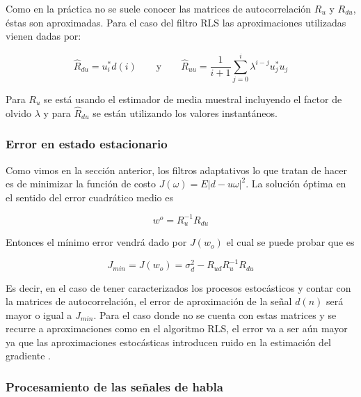 Como en la práctica no se suele conocer las matrices de autocorrelación $R_u$ y $R_{du}$, éstas son aproximadas. Para el caso del filtro RLS las aproximaciones utilizadas vienen dadas por:

\begin{equation*}
	\hat{R}_{du} = u_i^* d(i) \qquad \text{y} \qquad \hat{R}_{uu} = \frac{1}{i+1} \sum_{j=0}^{i} \lambda^{i-j} u_j^* u_j
\end{equation*}

Para $R_u$ se está usando el estimador de media muestral incluyendo el factor de olvido $\lambda$ y para $\hat{R}_{du}$ se están utilizando los valores instantáneos.

\subsubsection{Error en estado estacionario}
\label{sec:adaptive_filter_stationary_error}

Como vimos en la sección anterior, los filtros adaptativos lo que tratan de hacer es de minimizar la función de costo $J(\omega) = E | d - u \omega |^2$. La solución óptima en el sentido del error cuadrático medio es \cite{fundamentals_of_adaptive_filtering}

\begin{equation*}
	w^o = R_u^{-1}R_{du}
\end{equation*}

Entonces el mínimo error vendrá dado por $J(w_o)$ el cual se puede probar que es \cite{fundamentals_of_adaptive_filtering}

\begin{equation*}
	J_{min} = J(w_o) = \sigma_d^2 - R_{ud} R_{u}^{-1} R_{du}
\end{equation*}

Es decir, en el caso de tener caracterizados los procesos estocásticos y contar con la matrices de autocorrelación, el error de aproximación de la señal $d(n)$ será mayor o igual a $J_{min}$. Para el caso donde no se cuenta con estas matrices y se recurre a aproximaciones como en el algoritmo RLS, el error va a ser aún mayor ya que las aproximaciones estocásticas introducen ruido en la estimación del gradiente \cite{fundamentals_of_adaptive_filtering}.

\subsubsection{Procesamiento de las señales de habla}
\label{sec:filtro_adaptativo_procesamiento_de_señales}

